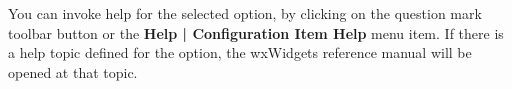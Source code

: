You can invoke help for the selected option, by clicking
on the question mark toolbar button or the {\bf Help | Configuration Item Help} menu
item. If there is a help topic defined for the option, the
wxWidgets reference manual will be opened at that topic.

\begin{comment}
\chapter{Getting started: a step-by-step guide}\label{gettingstarted}%
\setheader{{\it CHAPTER \thechapter}}{}{}{}{}{{\it CHAPTER \thechapter}}%
\setfooter{\thepage}{}{}{}{}{\thepage}%

This section will quickly get you up and running with \ctshortname. Click
on \helpref{Step 1}{step1} to start. If you are
using a Mac, please interpret 'left-click' to mean 'click', and
'right-click' to mean 'control-click'.

\section{Step 1: creating a new configuration}\label{step1}

When you run \ctshortname for the first time, you are presented with an
empty configuration window.

Go to \helpref{Step 2}{step2} to learn how to do the next thing.

\section{Step 2: doing something else}\label{step2}

Go to \helpref{Step 3}{step3} to learn how to do a third thing.

\section{Step 3: a third thing}\label{step3}

Go to \helpref{Step 4}{step4} to learn about saving your document and reloading it.

\section{Step 4: saving and loading documents}\label{step4}

You may wish to save a document, so you can come back to it later. Click on {\bf File | Save} or
the \image{}{save.png} toolbar button. The first time you save the file, you will be prompted
for a filename: you can accept the default one provided, or choose another.


\end{comment}

